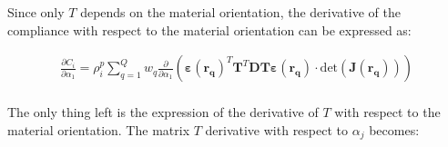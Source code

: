 Since only $T$ depends on the material orientation, the derivative of the compliance with respect to the material orientation can be expressed as:

\begin{align}
\frac{\partial C_i}{\partial \alpha_{1}} = \rho_i^p \sum_{q=1}^Q w_q \frac{\partial}{\partial \alpha_{1}} \left( \mathbf{\varepsilon(\mathbf{r}_q)}^T  \mathbf{T}^T \mathbf{D} \mathbf{T} \mathbf{\varepsilon(\mathbf{r}_q)} \cdot \text{det}(\mathbf{J(\mathbf{r}_q)}) \right)\\
\end{align}

The only thing left is the expression of the derivative of $T$ with respect to the material orientation.
The matrix \( T \) derivative with respect to \( \alpha_{j} \) becomes:

